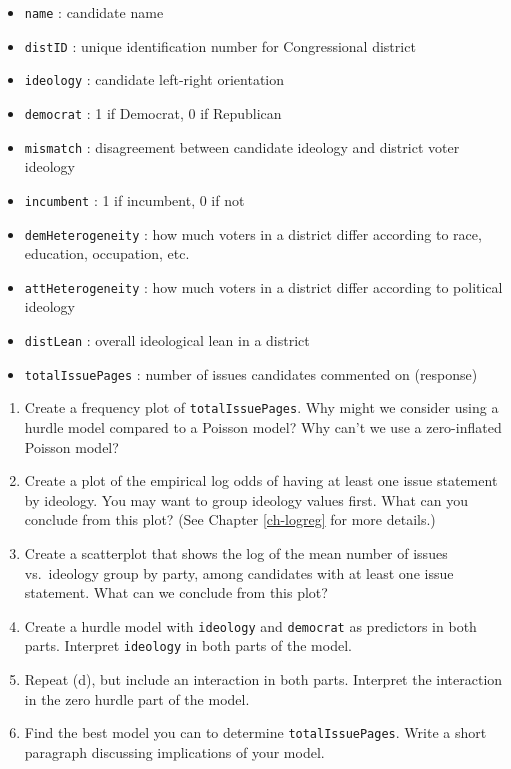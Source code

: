 \documentclass[
]{krantz}
\providecommand{\tightlist}{%
  \setlength{\itemsep}{0pt}\setlength{\parskip}{0pt}}
\begin{document}
\begin{enumerate}
  \begin{itemize}
  \tightlist
  \item
    \texttt{name} : candidate name
  \item
    \texttt{distID} : unique identification number for Congressional district
  \item
    \texttt{ideology} : candidate left-right orientation
  \item
    \texttt{democrat} : 1 if Democrat, 0 if Republican
  \item
    \texttt{mismatch} : disagreement between candidate ideology and district voter ideology
  \item
    \texttt{incumbent} : 1 if incumbent, 0 if not
  \item
    \texttt{demHeterogeneity} : how much voters in a district differ according to race, education, occupation, etc.
  \item
    \texttt{attHeterogeneity} : how much voters in a district differ according to political ideology
  \item
    \texttt{distLean} : overall ideological lean in a district
  \item
    \texttt{totalIssuePages} : number of issues candidates commented on (response)
  \end{itemize}

  \begin{enumerate}
  \def\labelenumii{\alph{enumii}.}
  \tightlist
  \item
    Create a frequency plot of \texttt{totalIssuePages}. Why might we consider using a hurdle model compared to a Poisson model? Why can't we use a zero-inflated Poisson model?
  \item
    Create a plot of the empirical log odds of having at least one issue statement by ideology. You may want to group ideology values first. What can you conclude from this plot? (See Chapter \ref{ch-logreg} for more details.)
  \item
    Create a scatterplot that shows the log of the mean number of issues vs.~ideology group by party, among candidates with at least one issue statement. What can we conclude from this plot?
  \item
    Create a hurdle model with \texttt{ideology} and \texttt{democrat} as predictors in both parts. Interpret \texttt{ideology} in both parts of the model.
  \item
    Repeat (d), but include an interaction in both parts. Interpret the interaction in the zero hurdle part of the model.
  \item
    Find the best model you can to determine \texttt{totalIssuePages}. Write a short paragraph discussing implications of your model.
  \end{enumerate}
\end{enumerate}
\end{document}
